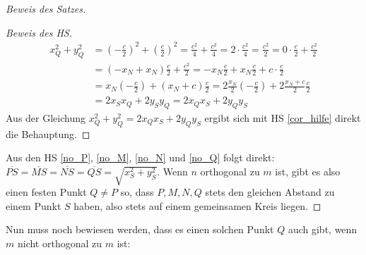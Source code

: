 \begin{proof}[Beweis des Satzes]
\begin{proof}[Beweis des HS]
        \begin{align*}
            x_Q^2+y_Q^2&=\left(-\frac{c}{2}\right)^2+\left(\frac{c}{2}\right)^2=\frac{c^2}{4}+\frac{c^2}{4}
            =2\cdot \frac{c^2}{4}=\frac{c^2}{2}=0\cdot \frac{c}{2}+\frac{c^2}{2}\\
            &=(-x_N+x_N)\frac{c}{2}+\frac{c^2}{2}=-x_N\frac{c}{2}+x_N\frac{c}{2}+c\cdot\frac{c}{2}\\
            &=x_N\left(-\frac{c}{2}\right)+(x_N+c)\frac{c}{2}=2\frac{x_N}{2}
            \left(-\frac{c}{2}\right)+2\frac{x_N+c}{2}\frac{c}{2}\\
            &=2x_Sx_Q+2y_Sy_Q=2x_Qx_S+2y_Qy_S
        \end{align*}
        Aus der Gleichung $x_Q^2+y_Q^2=2x_Qx_S+2y_Qy_S$ ergibt sich mit HS \ref{cor_hilfe} direkt die Behauptung.
    \end{proof}
    Aus den HS \ref{no_P}, \ref{no_M}, \ref{no_N} und \ref{no_Q} folgt direkt: 
    $\overline{PS}=\overline{MS}=\overline{NS}=\overline{QS}=\sqrt{x_S^2+y_S^2}$. Wenn $n$ orthogonal zu $m$ ist, 
    gibt es also einen festen Punkt $Q\neq P$ so, dass $P,M,N,Q$ stets den gleichen Abstand zu einem Punkt $S$ haben, 
    also stets auf einem gemeinsamen Kreis liegen.
    \renewcommand{\qedsymbol}{$\blacksquare$}
\end{proof}

Nun muss noch bewiesen werden, dass es einen solchen Punkt $Q$ auch gibt, wenn $m$ nicht orthogonal zu $m$ ist:

